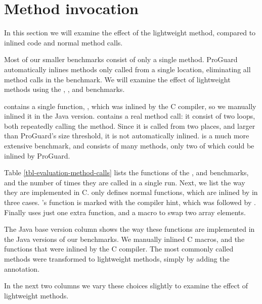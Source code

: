 \section{Method invocation}
\label{sec-evaluation-method-invocation}


In this section we will examine the effect of the lightweight method, compared to inlined code and normal method calls.

Most of our smaller benchmarks consist of only a single method. ProGuard automatically inlines methods only called from a single location, eliminating all method calls in the  benchmark. We will examine the effect of lightweight methods using the , , and  benchmarks.

 contains a single function, , which was inlined by the C compiler, so we manually inlined it in the Java version.  contains a real method call: it consist of two loops, both repeatedly calling the  method. Since it is called from two places, and larger than ProGuard's size threshold, it is not automatically inlined.  is a much more extensive benchmark, and consists of many methods, only two of which could be inlined by ProGuard.

Table \ref{tbl-evaluation-method-calls} lists the functions of the ,  and  benchmarks, and the number of times they are called in a single run. Next, we list the way they are implemented in C.  only defines normal functions, which are inlined by  in three cases. 's  function is marked with the  compiler hint, which was followed by . Finally  uses just one extra function, and a macro to swap two array elements.

The Java base version column shows the way these functions are implemented in the Java versions of our benchmarks. We manually inlined C macros, and the functions that were inlined by the C compiler. The most commonly called methods were transformed to lightweight methods, simply by adding the  annotation. %

In the next two columns we vary these choices slightly to examine the effect of lightweight methods.

